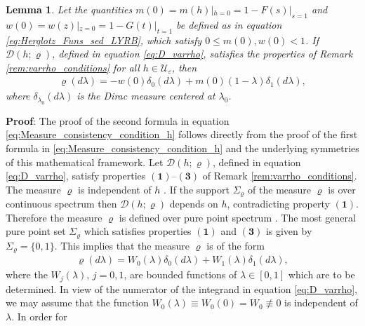 \documentclass[english,12pt,jmp,graphicx]{revtex4-1}
\newtheorem{lemma}{Lemma}[section]
\begin{document}
%
%
\begin{lemma}\label{lem:Measure_consistency_condition}
  Let the quantities $m(0)=m(h)|_{h=0}=1-F(s)|_{s=1}$ and
  $w(0)=w(z)|_{z=0}=1-G(t)|_{t=1}$ be defined as in equation
  \eqref{eq:Herglotz_Funs_sed_LYRB}, which satisfy $0\leq m(0),w(0)<1$. If
  $\mathcal{D}(h;\varrho)$, defined in equation \eqref{eq:D_varrho},
  satisfies the properties of Remark \ref{rem:varrho_conditions} for
  all $h\in\mathcal{U}_\varepsilon$, then     
\begin{align}\label{eq:Measure_consistency_condition_h}
 \varrho(d\lambda)=-w(0)\delta_0(d\lambda)+m(0)(1-\lambda)\delta_1(d\lambda),
\end{align}
%
where $\delta_{\lambda_0}(d\lambda)$ is the Dirac measure centered at $\lambda_0$. 
%
\end{lemma}
%
\noindent \textbf{Proof}:
%
The proof of the second formula in equation
\eqref{eq:Measure_consistency_condition_h} follows directly from the
proof of the first formula in \eqref{eq:Measure_consistency_condition_h}
and the underlying symmetries of this mathematical framework. Let
$\mathcal{D}(h;\varrho)$, defined in equation \eqref{eq:D_varrho}, satisfy
properties $\mathbf{(1)}$--$\mathbf{(3)}$ of Remark
\ref{rem:varrho_conditions}. The measure $\varrho$ is independent of $h$
\cite{Golden:CMP-473}. If the support $\Sigma_\varrho$ of the measure $\varrho$ is over
continuous spectrum \cite{Reed-1980} then $\mathcal{D}(h;\varrho)$ depends
on $h$, contradicting property $\mathbf{(1)}$. Therefore the measure
$\varrho$ is defined over pure point spectrum
\cite{Reed-1980}. The most general pure point set $\Sigma_\varrho$ which
satisfies properties $\mathbf{(1)}$ and $\mathbf{(3)}$ is given by
$\Sigma_\varrho=\{0,1\}$. This implies that the measure $\varrho$ is of the form  
% 
\begin{align*}
  \varrho(d\lambda)=W_0(\lambda)\delta_0(d\lambda)+W_1(\lambda)\delta_1(d\lambda),
\end{align*}
%
where the $W_j(\lambda)$, $j=0,1$, are bounded functions of $\lambda\in[0,1]$ which are to
be determined. In view of the numerator of the integrand in equation
\eqref{eq:D_varrho}, we may assume that the function
$W_0(\lambda)\equiv W_0(0)=W_0\not\equiv0$ is independent of $\lambda$. In order for
\end{document}
